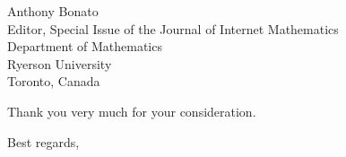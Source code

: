 \begin{letter}{
Anthony Bonato \\
Editor, Special Issue of the Journal of Internet Mathematics  \\
Department of Mathematics \\
Ryerson University \\
Toronto, Canada
}


Thank you very much for your consideration.

\closing{Best regards,}
\end{letter}





